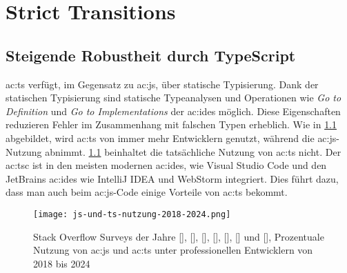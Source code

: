 \chapter{Strict Transitions} \label{ch:strict-transitions}

\section{Steigende Robustheit durch TypeScript}

\acrlong{ac:ts} verfügt, im Gegensatz zu \acrlong{ac:js}, über statische Typisierung. Dank der statischen Typisierung sind statische Typeanalysen und Operationen wie \textit{Go to Definition} und \textit{Go to Implementations} der \acrshort{ac:ide}s möglich. Diese Eigenschaften reduzieren Fehler im Zusammenhang mit falschen Typen erheblich. Wie in \ref{fig:js-und-ts-nutzung-2018-2024} abgebildet, wird \acrlong{ac:ts} von immer mehr Entwicklern genutzt, während die \acrlong{ac:js}-Nutzung abnimmt. \ref{fig:js-und-ts-nutzung-2018-2024} beinhaltet die tatsächliche Nutzung von \acrshort{ac:ts} nicht. Der \acrlong{ac:tsc} ist in den meisten modernen \acrshort{ac:ide}s, wie Visual Studio Code und den JetBrains \acrshort{ac:ide}s wie IntelliJ IDEA und WebStorm integriert. Dies führt dazu, dass man auch beim \acrlong{ac:js}-Code einige Vorteile von \acrlong{ac:ts} bekommt.\cite{typeScriptDocumentary}

\begin{figure}[H]
  \texttt{[image: js-und-ts-nutzung-2018-2024.png]}
  \caption{Stack Overflow Surveys der Jahre
  [\citeyear{stackOverflowSurvey2018MostPopularTechnologies}],
  [\citeyear{stackOverflowSurvey2019MostPopularTechnologies}],
  [\citeyear{stackOverflowSurvey2020MostPopularTechnologies}],
  [\citeyear{stackOverflowSurvey2021MostPopularTechnologies}],
  [\citeyear{stackOverflowSurvey2022MostPopularTechnologies}],
  [\citeyear{stackOverflowSurvey2023MostPopularTechnologies}] und
  [\citeyear{stackOverflowSurvey2024MostPopularTechnologies}], Prozentuale Nutzung von \acrlong{ac:js} und \acrlong{ac:ts} unter professionellen Entwicklern von 2018 bis 2024}
  \label{fig:js-und-ts-nutzung-2018-2024}
\end{figure}



